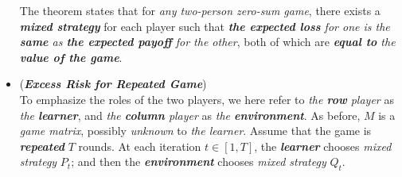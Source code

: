\documentclass[11pt]{article}
\begin{document}
\begin{itemize}
\begin{remark}
The theorem states that for \emph{any two-person zero-sum game}, there exists a \emph{\textbf{mixed strategy}} for each player such that \emph{\textbf{the expected loss} for one is the \textbf{same} as \textbf{the expected payoff} for the other}, both of which are \emph{\textbf{equal to} the \textbf{value of the game}}.
\end{remark}

\item \begin{remark}(\textbf{\emph{Excess Risk for Repeated Game}})\\
To emphasize the roles of the two players, we here refer to \emph{the \textbf{row} player} as \emph{the \textbf{learner}}, and \emph{the \textbf{column} player} as \emph{the \textbf{environment}}. As before, $M$ is a \emph{game matrix}, possibly \emph{unknown} to \emph{the learner}. Assume that the game is \emph{\textbf{repeated}} $T$ rounds. At each iteration $t \in [1, T]$, the \emph{\textbf{learner}} chooses \emph{mixed strategy} $P_t$; and then the \emph{\textbf{environment}} chooses \emph{mixed strategy} $Q_t$.
%


\end{remark}
\end{itemize}
\end{document}
